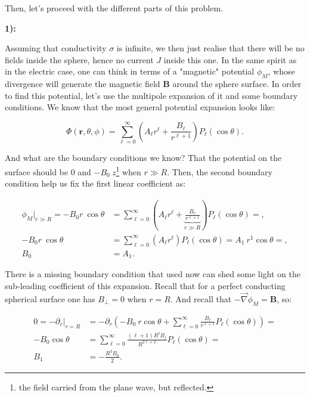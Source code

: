 Then, let's proceed with the different parts of this problem.

\textbf{1):}

Assuming that conductivity $\sigma$ is infinite, we then just realise that there will be no fields inside the sphere, hence no current $J$ inside this one. In the same spirit as in the electric case, one can think in terms of a "magnetic" potential $\phi_{M}$, whose divergence will generate the magnetic field $\mathbf{B}$ around the sphere surface. In order to find this potential, let's use the multipole expansion of it and some boundary conditions. We know that the most general potential expansion looks like:
	
\begin{equation}
	\Phi(\mathbf{r},\theta, \phi)=\sum_{\ell=0}^{\infty}\left( A_{\ell } r^{\ell}  + \frac{B_{\ell }}{r^{\ell+1}} \right) P_{\ell}(\cos\theta).
\end{equation}

And what are the boundary conditions we know? That the potential on the surface should be 0 and $-B_{0}\:z$\footnote{the field carried from the plane wave, but reflected.} when $r\gg R$. Then, the second boundary condition help us fix the first linear coefficient as:

\begin{equation}
	\begin{split}
		\phi_{M}|_{r\gg R} = -B_{0} r\: \cos\theta &= \sum_{\ell=0}^{\infty}\left( A_{\ell } r^{\ell}  + \underbrace{\frac{B_{\ell }}{r^{\ell+1}}}_{r\gg R} \right) P_{\ell}(\cos\theta) =,\\
		-B_{0} r\: \cos\theta &= \sum_{\ell=0}^{\infty}\left( A_{\ell } r^{\ell} \right) P_{\ell}(\cos\theta) = A_{1}\: r^{1} \cos\theta=,\\
		B_{0} &= A_{1}.
	\end{split}	 
\end{equation}

There is a missing boundary condition that used now can shed some light on the sub-leading coefficient of this expansion. Recall that for a perfect conducting spherical surface one has $B_{\perp} =0$ when $r=R$. And recall that $-\vec{\nabla} \phi_{M} = \mathbf{B}$, so:

\begin{equation}
	\begin{split}
		0= -\partial_{r}|_{r=R} &= 	-\partial_{r}\left(-B_{0}\: r\cos\theta + \sum_{\ell=0}^{\infty}\frac{ B_{\ell}}{ r^{\ell + 1}} P_{\ell}(\cos\theta)\right)=\\
		-B_{0} \cos\theta &= \sum_{\ell=0}^{\infty}\frac{(\ell+1) R^{\ell}B_{\ell }}{ R^{2 \ell + 2}} P_{\ell}(\cos\theta)=\\
		B_{1} &= -\frac{R^{3} B_{0}}{2}.
	\end{split}
\end{equation}

